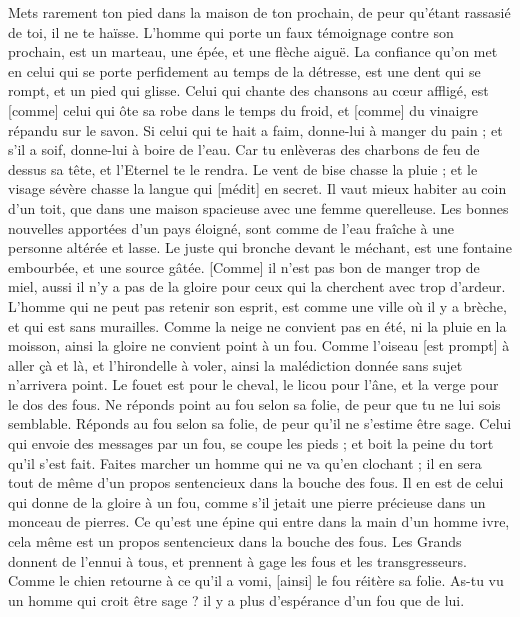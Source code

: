 \begin{multicols}{2}
Mets rarement ton pied dans la maison de ton prochain, de peur qu'étant rassasié de toi, il ne te haïsse.
L'homme qui porte un faux témoignage contre son prochain, est un marteau, une épée, et une flèche aiguë.
La confiance qu'on met en celui qui se porte perfidement au temps de la détresse, est une dent qui se rompt, et un pied qui glisse.
Celui qui chante des chansons au cœur affligé, est [comme] celui qui ôte sa robe dans le temps du froid, et [comme] du vinaigre répandu sur le savon.
Si celui qui te hait a faim, donne-lui à manger du pain ; et s'il a soif, donne-lui à boire de l'eau.
Car tu enlèveras des charbons de feu de dessus sa tête, et l'Eternel te le rendra.
Le vent de bise chasse la pluie ; et le visage sévère chasse la langue qui [médit] en secret.
Il vaut mieux habiter au coin d'un toit, que dans une maison spacieuse avec une femme querelleuse.
Les bonnes nouvelles apportées d'un pays éloigné, sont comme de l'eau fraîche à une personne altérée et lasse.
Le juste qui bronche devant le méchant, est une fontaine embourbée, et une source gâtée.
[Comme] il n'est pas bon de manger trop de miel, aussi il n'y a pas de la gloire pour ceux qui la cherchent avec trop d'ardeur.
L'homme qui ne peut pas retenir son esprit, est comme une ville où il y a brèche, et qui est sans murailles.
\VerseOne{}Comme la neige ne convient pas en été, ni la pluie en la moisson, ainsi la gloire ne convient point à un fou.
Comme l'oiseau [est prompt] à aller çà et là, et l'hirondelle à voler, ainsi la malédiction donnée sans sujet n'arrivera point.
Le fouet est pour le cheval, le licou pour l'âne, et la verge pour le dos des fous.
Ne réponds point au fou selon sa folie, de peur que tu ne lui sois semblable.
Réponds au fou selon sa folie, de peur qu'il ne s'estime être sage.
Celui qui envoie des messages par un fou, se coupe les pieds ; et boit la peine du tort qu'il s'est fait.
Faites marcher un homme qui ne va qu'en clochant ; il en sera tout de même d'un propos sentencieux dans la bouche des fous.
Il en est de celui qui donne de la gloire à un fou, comme s'il jetait une pierre précieuse dans un monceau de pierres.
Ce qu'est une épine qui entre dans la main d'un homme ivre, cela même est un propos sentencieux dans la bouche des fous.
Les Grands donnent de l'ennui à tous, et prennent à gage les fous et les transgresseurs.
Comme le chien retourne à ce qu'il a vomi, [ainsi] le fou réitère sa folie.
As-tu vu un homme qui croit être sage ? il y a plus d'espérance d'un fou que de lui.

\end{multicols}
